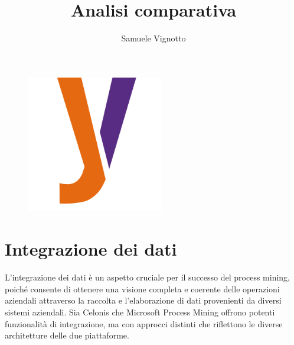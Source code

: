 \documentclass{article}
\title{\Huge{\textbf{Analisi comparativa}}\vspace{-1em}}
\author{Samuele Vignotto}
\date{}
\begin{document}
\maketitle
\begin{figure}[h]
  \centering
  \includegraphics[width=6cm, height=6cm]{Logo/Y_LOGO-SOLO.png}
  \label{fig:immagine}
\end{figure}

\newpage
\tableofcontents
\newpage

\section{Integrazione dei dati}
L'integrazione dei dati è un aspetto cruciale per il successo del process mining, poiché consente di ottenere una visione completa e coerente delle operazioni aziendali attraverso la raccolta e l'elaborazione di dati provenienti da diversi sistemi aziendali. Sia Celonis che Microsoft Process Mining offrono potenti funzionalità di integrazione, ma con approcci distinti che riflettono le diverse architetture delle due piattaforme.
\end{document}
